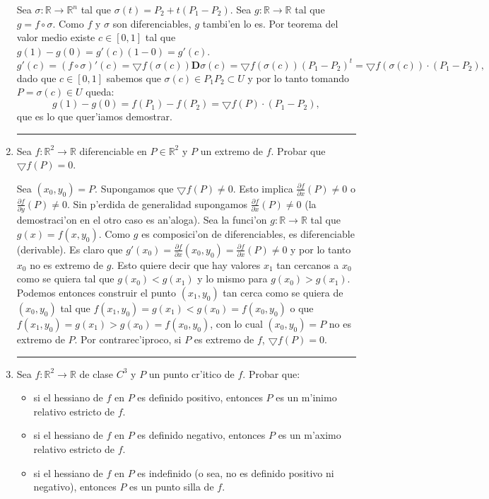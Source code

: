 \documentclass[a4paper,spanish]{article}
\newcommand{\R}[0]{\mathbb{R}}
\newcommand{\comp}[0]{\circ}
\newcommand{\parcial}[2]{\frac{\partial #1}{\partial #2}}
\newcommand{\D}[0]{\mathbf{D}}
\newcommand{\grad}[0]{\bigtriangledown}
\newenvironment{demo}{{\noindent \textbf{Demo: }}}{\hfill\rule{2mm}{2mm}\par}
\begin{document}
\begin{enumerate}
\begin{demo}
Sea $\sigma : \R \to \R^n$ tal que $\sigma(t) = P_2 + t(P_1 - P_2)$. Sea 
$g : \R \to \R$ tal que $g = f \comp \sigma$. Como $f$ y $\sigma$ son
diferenciables, $g$ tambi'en lo es. Por teorema del valor medio existe 
$c \in [0,1]$ tal que $g(1) - g(0) = g'(c)(1 - 0) = g'(c)$.
$$g'(c) = (f \comp \sigma)'(c) = \grad f(\sigma(c)) \D \sigma(c) = 
	\grad f(\sigma(c)) (P_1 - P_2)^t = \grad f(\sigma(c)) \cdot (P_1 - P_2),$$
dado que $c \in [0,1]$ sabemos que $\sigma(c) \in P_1 P_2 \subset U$ y por lo
tanto tomando $P = \sigma(c) \in U$ queda:
$$g(1) - g(0) = f(P_1) - f(P_2) = \grad f(P) \cdot (P_1 - P_2),$$
que es lo que quer'iamos demostrar.
\end{demo}

\item Sea $f : \R^2 \to \R$ diferenciable en $P \in \R^2$ y $P$ un extremo de 
$f$. Probar que $\grad f(P) = 0$.

\begin{demo}
Sea $(x_0,y_0) = P$. Supongamos que $\grad f(P) \neq 0$. Esto implica 
$\parcial{f}{x}(P) \neq 0$ o $\parcial{f}{y}(P) \neq 0$. Sin p'erdida de
generalidad supongamos $\parcial{f}{x}(P) \neq 0$ (la demostraci'on en el otro
caso es an'aloga). Sea la funci'on $g : \R \to \R$ tal que $g(x) = f(x,y_0)$. 
Como $g$ es composici'on de diferenciables, es diferenciable (derivable).
Es claro que $g'(x_0) = \parcial{f}{x}(x_0,y_0) = \parcial{f}{x}(P) \neq 0$
y por lo tanto $x_0$ no es extremo de $g$. Esto quiere decir que hay valores
$x_1$ tan cercanos a $x_0$ como se quiera tal que $g(x_0) < g(x_1)$ y lo
mismo para $g(x_0) > g(x_1)$. Podemos entonces construir el punto $(x_1,y_0)$
tan cerca como se quiera de $(x_0,y_0)$ tal que
$f(x_1,y_0) = g(x_1) < g(x_0) = f(x_0,y_0)$ o que 
$f(x_1,y_0) = g(x_1) > g(x_0) = f(x_0,y_0)$, con lo cual $(x_0,y_0) = P$ no es
extremo de $P$. Por contrarec'iproco, si $P$ es extremo de $f$,
$\grad f(P) = 0$.
\end{demo}

\item Sea $f : \R^2 \to \R$ de clase $C^3$ y $P$ un punto cr'itico de $f$. 
Probar que:
\begin{itemize}
\item si el hessiano de $f$ en $P$ es definido positivo, entonces $P$ es un 
m'inimo relativo estricto de $f$.
\item si el hessiano de $f$ en $P$ es definido negativo, entonces $P$ es un 
m'aximo relativo estricto de $f$.
\item si el hessiano de $f$ en $P$ es indefinido (o sea, no es definido 
positivo ni negativo), entonces $P$ es un punto silla de $f$.
\end{itemize}


\end{enumerate}
\end{document}
